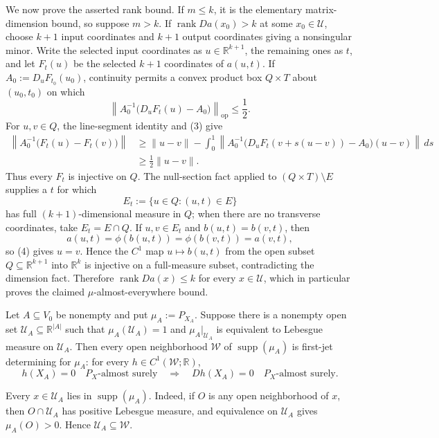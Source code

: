 We now prove the asserted rank bound.  If \(m\leq k\), it is the elementary matrix-dimension bound, so suppose \(m>k\).  If \(\operatorname{rank}Da(x_0)>k\) at some \(x_0\in\mathcal U\), choose \(k+1\) input coordinates and \(k+1\) output coordinates giving a nonsingular minor.  Write the selected input coordinates as \(u\in\mathbb R^{k+1}\), the remaining ones as \(t\), and let \(F_t(u)\) be the selected \(k+1\) coordinates of \(a(u,t)\).  If \(A_0:=D_uF_{t_0}(u_0)\), continuity permits a convex product box \(Q\times T\) about \((u_0,t_0)\) on which
\[
 \left\|A_0^{-1}\bigl(D_uF_t(u)-A_0\bigr)\right\|_{\mathrm{op}}\leq\frac12. \tag{3}
\]
For \(u,v\in Q\), the line-segment identity and (3) give
\[
 \begin{aligned}
 \left\|A_0^{-1}\bigl(F_t(u)-F_t(v)\bigr)\right\|
 &\geq \|u-v\|
 -\int_0^1\left\|A_0^{-1}
 \bigl(D_uF_t(v+s(u-v))-A_0\bigr)(u-v)\right\|\,ds\\
 &\geq\frac12\|u-v\|. 
 \end{aligned} \tag{4}
\]
Thus every \(F_t\) is injective on \(Q\).  The null-section fact applied to \((Q\times T)\setminus E\) supplies a \(t\) for which
\[
 E_t:=\{u\in Q:(u,t)\in E\}
\]
has full \((k+1)\)-dimensional measure in \(Q\); when there are no transverse coordinates, take \(E_t=E\cap Q\).  If \(u,v\in E_t\) and \(b(u,t)=b(v,t)\), then
\[
 a(u,t)=\phi(b(u,t))=\phi(b(v,t))=a(v,t),
\]
so (4) gives \(u=v\).  Hence the \(C^1\) map \(u\mapsto b(u,t)\) from the open subset \(Q\subseteq\mathbb R^{k+1}\) into \(\mathbb R^k\) is injective on a full-measure subset, contradicting the dimension fact.  Therefore \(\operatorname{rank}Da(x)\leq k\) for every \(x\in\mathcal U\), which in particular proves the claimed \(\mu\)-almost-everywhere bound.

Let \(A\subseteq V_0\) be nonempty and put \(\mu_A:=P_{X_A}\).  Suppose there is a nonempty open set \(\mathcal U_A\subseteq\mathbb R^{|A|}\) such that \(\mu_A(\mathcal U_A)=1\) and \(\mu_A|_{\mathcal U_A}\) is equivalent to Lebesgue measure on \(\mathcal U_A\).  Then every open neighborhood \(\mathcal W\) of \(\operatorname{supp}(\mu_A)\) is first-jet determining for \(\mu_A\): for every \(h\in C^1(\mathcal W;\mathbb R)\),
\[
 h(X_A)=0\quad P_X\text{-almost surely}
 \quad\Longrightarrow\quad
 Dh(X_A)=0\quad P_X\text{-almost surely}.
\]

Every \(x\in\mathcal U_A\) lies in \(\operatorname{supp}(\mu_A)\).  Indeed, if \(O\) is any open neighborhood of \(x\), then \(O\cap\mathcal U_A\) has positive Lebesgue measure, and equivalence on \(\mathcal U_A\) gives \(\mu_A(O)>0\).  Hence \(\mathcal U_A\subseteq\mathcal W\).

